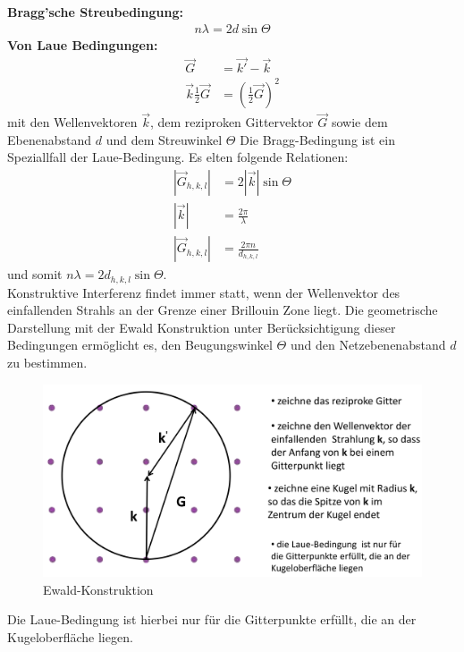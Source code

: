\textbf{Bragg'sche Streubedingung:}
\begin{align}
    n\lambda = 2 d \sin{\Theta} 
\end{align}
\textbf{Von Laue Bedingungen:}
\begin{align}
\vec{G} &= \vec{k'} - \vec{k} \\
\vec{k} \frac{1}{2} \vec{G} &= (\frac{1}{2} \vec{G})^2
\end{align}
mit den Wellenvektoren $\vec{k}$, dem reziproken Gittervektor $\vec{G}$ sowie dem Ebenenabstand $d$ und dem Streuwinkel $\Theta$ Die Bragg-Bedingung ist ein Speziallfall der Laue-Bedingung. Es elten folgende Relationen:
\begin{align}
    |\vec{G}_{h,k,l}| &= 2 |\vec{k}| \sin{\Theta} \\
    |\vec{k}| &= \frac{2 \pi}{\lambda} \\
    |\vec{G}_{h,k,l}| &= \frac{2 \pi n}{ d_{h,k,l}}
\end{align}
und somit $n \lambda = 2 d_{h,k,l}  \sin{\Theta}$. \\
Konstruktive Interferenz findet immer statt, wenn der Wellenvektor des
einfallenden Strahls an der Grenze einer Brillouin Zone liegt. Die geometrische Darstellung mit der Ewald Konstruktion unter Berücksichtigung dieser Bedingungen ermöglicht es, den Beugungswinkel $\Theta$ und den Netzebenenabstand $d$ zu bestimmen. 

\begin{figure}[H]
    \centering
    \begin{samepage}
        \includegraphics[width=0.8\linewidth]{resources/09-05-2012/Ewald_Konstruktion.png}
        \caption{Ewald-Konstruktion}
    \end{samepage}
\end{figure}

Die Laue-Bedingung ist hierbei nur für die Gitterpunkte erfüllt, die an der Kugeloberfläche liegen. 


\label{q:27}

